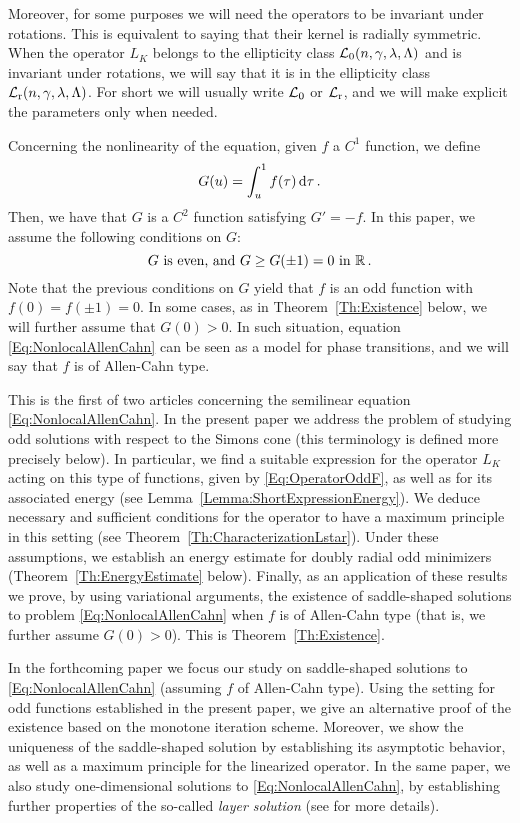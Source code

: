 Moreover, for some purposes we will need the operators to be invariant under rotations. This is equivalent to saying that their kernel is radially symmetric. When the operator $L_K$ belongs to the ellipticity class $\mathcal{L}_0(n,\gamma,\lambda, \Lambda)$ and is invariant under rotations, we will say that it is in the ellipticity class $\mathcal{L}_{\mathrm{r}}(n,\gamma,\lambda, \Lambda)$. For short we will usually write $\mathcal{L}_0$ or $\mathcal{L}_{\mathrm{r}}$, and we will make explicit the parameters only when needed.

Concerning the nonlinearity of the equation, given $f$ a $C^1$ function, we define
$$
G(u)= \int_u^1 f(\tau) \,\mathrm{d} \tau\,.
$$
Then, we have that $G$ is a $C^2$ function satisfying $G' = -f$. In this paper, we assume the following conditions on $G$:
\begin{equation}
\label{Eq:HipothesesG}
G \textrm{ is even, and } G\geq G(\pm 1 )=0 \textrm{ in } \mathbb{R}\,.
\end{equation}
Note that the previous conditions on $G$ yield that $f$ is an odd function with $f(0)=f(\pm 1)=0$. In some cases, as in Theorem~\ref{Th:Existence} below, we will further assume that $G(0)>0$. In such situation, equation \eqref{Eq:NonlocalAllenCahn} can be seen as a model for phase transitions, and we will say that $f$ is of Allen-Cahn type.

This is the first of two articles concerning the semilinear equation \eqref{Eq:NonlocalAllenCahn}. In the present paper we address the problem of studying odd solutions with respect to the Simons cone (this terminology is  defined more precisely below). In particular, we find a suitable expression for the operator $L_K$  acting on this type of functions, given by \eqref{Eq:OperatorOddF}, as well as for its associated energy (see Lemma~\ref{Lemma:ShortExpressionEnergy}). We deduce necessary and sufficient conditions for the operator to have a maximum principle in this setting (see Theorem~\ref{Th:CharacterizationLstar}). Under these assumptions, we establish an energy estimate for doubly radial odd minimizers (Theorem~\ref{Th:EnergyEstimate} below). Finally, as an application of these results we prove, by using variational arguments, the existence of saddle-shaped solutions to problem \eqref{Eq:NonlocalAllenCahn} when $f$ is of Allen-Cahn type (that is, we further assume $G(0)>0$). This is Theorem~\ref{Th:Existence}.

In the forthcoming paper \cite{FelipeSanz-Perela:IntegroDifferentialII} we focus our study on saddle-shaped solutions to \eqref{Eq:NonlocalAllenCahn} (assuming $f$ of Allen-Cahn type). Using the setting for odd functions established in the present paper, we give an alternative proof of the existence based on the monotone iteration scheme. Moreover, we show the uniqueness of the saddle-shaped solution by establishing its asymptotic behavior, as well as a maximum principle for the linearized operator. In the same paper, we also study one-dimensional solutions to \eqref{Eq:NonlocalAllenCahn}, by establishing further properties of the so-called \emph{layer solution} (see \cite{CabreSolaMorales, CabreSireI, CozziPassalacqua} for more details).



